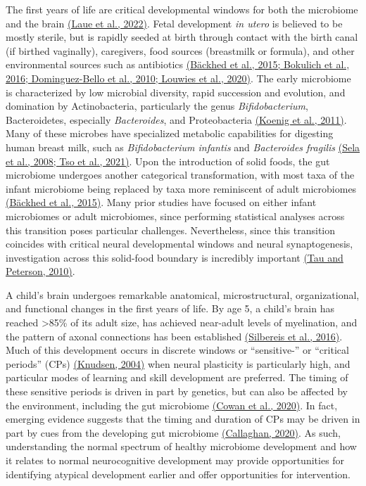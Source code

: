 The first years of life are critical developmental windows for both the
microbiome and the brain
\href{https://www.zotero.org/google-docs/?XTqhlm}{(Laue et al., 2022)}.
Fetal development \emph{in utero} is believed to be mostly sterile, but
is rapidly seeded at birth through contact with the birth canal (if
birthed vaginally), caregivers, food sources (breastmilk or formula),
and other environmental sources such as antibiotics
\href{https://www.zotero.org/google-docs/?X6N0f4}{(Bäckhed et al., 2015;
Bokulich et al., 2016; Dominguez-Bello et al., 2010; Louwies et al.,
2020)}. The early microbiome is characterized by low microbial
diversity, rapid succession and evolution, and domination by
Actinobacteria, particularly the genus \emph{Bifidobacterium},
Bacteroidetes, especially \emph{Bacteroides}, and Proteobacteria
\href{https://www.zotero.org/google-docs/?VG43uh}{(Koenig et al.,
2011)}. Many of these microbes have specialized metabolic capabilities
for digesting human breast milk, such as \emph{Bifidobacterium infantis}
and \emph{Bacteroides fragilis}
\href{https://www.zotero.org/google-docs/?1dKzKj}{(Sela et al., 2008;
Tso et al., 2021)}. Upon the introduction of solid foods, the gut
microbiome undergoes another categorical transformation, with most taxa
of the infant microbiome being replaced by taxa more reminiscent of
adult microbiomes
\href{https://www.zotero.org/google-docs/?V3lY3p}{(Bäckhed et al.,
2015)}. Many prior studies have focused on either infant microbiomes or
adult microbiomes, since performing statistical analyses across this
transition poses particular challenges. Nevertheless, since this
transition coincides with critical neural developmental windows and
neural synaptogenesis, investigation across this solid-food boundary is
incredibly important
\href{https://www.zotero.org/google-docs/?d29bv8}{(Tau and Peterson,
2010)}.

A child's brain undergoes remarkable anatomical, microstructural,
organizational, and functional changes in the first years of life. By
age 5, a child's brain has reached \textgreater85\% of its adult size,
has achieved near-adult levels of myelination, and the pattern of axonal
connections has been established
\href{https://www.zotero.org/google-docs/?1jUZOO}{(Silbereis et al.,
2016)}. Much of this development occurs in discrete windows or
``sensitive-'' or ``critical periods'' (CPs)
\href{https://www.zotero.org/google-docs/?w4Pcze}{(Knudsen, 2004)} when
neural plasticity is particularly high, and particular modes of learning
and skill development are preferred. The timing of these sensitive
periods is driven in part by genetics, but can also be affected by the
environment, including the gut microbiome
\href{https://www.zotero.org/google-docs/?KTm9lQ}{(Cowan et al., 2020)}.
In fact, emerging evidence suggests that the timing and duration of CPs
may be driven in part by cues from the developing gut microbiome
\href{https://www.zotero.org/google-docs/?mAD1ne}{(Callaghan, 2020)}. As
such, understanding the normal spectrum of healthy microbiome
development and how it relates to normal neurocognitive development may
provide opportunities for identifying atypical development earlier and
offer opportunities for intervention.

